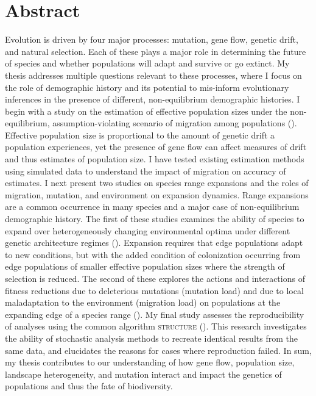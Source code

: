 \chapter*{Abstract}

Evolution is driven by four major processes: mutation, gene flow, genetic drift, and natural selection. Each of these plays a major role in determining the future of species and whether populations will adapt and survive or go extinct. My thesis addresses multiple questions relevant to these processes, where I focus on the role of demographic history and its potential to mis-inform evolutionary inferences in the presence of different, non-equilibrium demographic histories. I begin with a study on the estimation of effective population sizes under the non-equilibrium, assumption-violating scenario of migration among populations (). Effective population size is proportional to the amount of genetic drift a population experiences, yet the presence of gene flow can affect measures of drift and thus estimates of population size. I have tested existing estimation methods using simulated data to understand the impact of migration on accuracy of estimates. 
I next present two studies on species range expansions and the roles of migration, mutation, and environment on expansion dynamics. Range expansions are a common occurrence in many species and a major case of non-equilibrium demographic history. The first of these studies examines the ability of species to expand over heterogeneously changing environmental optima under different genetic architecture regimes (). Expansion requires that edge populations adapt to new conditions, but with the added condition of colonization occurring from edge populations of smaller effective population sizes where the strength of selection is reduced. The second of these explores the actions and interactions of fitness reductions due to deleterious mutations (mutation load) and due to local maladaptation to the environment (migration load) on populations at the expanding edge of a species range (). My final study assesses the reproducibility of analyses using the common algorithm \textsc{structure} (). This research investigates the ability of stochastic analysis methods to recreate identical results from the same data, and elucidates the reasons for cases where reproduction failed. In sum, my thesis contributes to our understanding of how gene flow, population size, landscape heterogeneity, and mutation interact and impact the genetics of populations and thus the fate of biodiversity.

